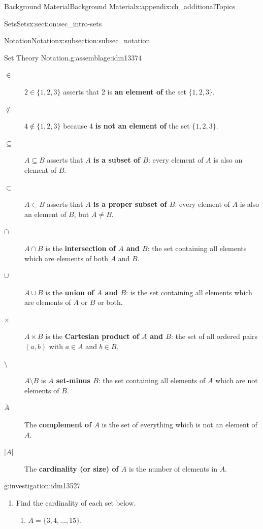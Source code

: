 \documentclass[oneside,10pt,]{book}
\newcommand{\terminology}[1]{\textbf{#1}}
\numberwithin{equation}{chapter}
\newcommand{\card}[1]{\left| #1 \right|}
\begin{document}
\begin{appendixptx}{Background Material}{}{Background Material}{}{}{x:appendix:ch_additionalTopics}
\begin{sectionptx}{Sets}{}{Sets}{}{}{x:section:sec_intro-sets}
\begin{subsectionptx}{Notation}{}{Notation}{}{}{x:subsection:subsec_notation}
\begin{assemblage}{Set Theory Notation.}{g:assemblage:idm13374}
\begin{description}
\item[{\(\in\)}]\(2 \in \{1,2,3\}\) asserts that 2 is \terminology{an element of} the set \(\{1,2,3\}\). \label{g:notation:idm13406}%
\item[{\(\not\in\)}]\(4 \notin \{1,2,3\}\) because 4 \terminology{is not an element of} the set \(\{1,2,3\}\).%
\item[{\(\subseteq\)}]\(A \subseteq B\) asserts that \terminology{\(A\) is a subset of \(B\)}: every element of \(A\) is also an element of \(B\).      \label{g:notation:idm13427}%
\item[{\(\subset\)}]\(A \subset B\) asserts that  \terminology{\(A\) is a proper subset of \(B\)}: every element of \(A\) is also an element of \(B\), but \(A \ne B\).\label{g:notation:idm13442}%
\item[{\(\cap\)}]\(A \cap B\) is the \terminology{intersection of \(A\) and \(B\)}: the set containing all elements which are elements of both \(A\) and \(B\). \label{g:notation:idm13456}%
\item[{\(\cup\)}]\(A \cup B\) is the \terminology{union of \(A\) and \(B\)}: is the set containing all elements which are elements of \(A\) or \(B\) or both.\label{g:notation:idm13471}%
\item[{\(\times\)}]\(A \times B\) is the \terminology{Cartesian product of \(A\) and   \(B\)}: the set of all ordered pairs \((a,b)\) with \(a \in A\) and \(b \in B\).\label{g:notation:idm13487}%
\item[{\(\setminus\)}]\(A \setminus B\) is \terminology{\(A\) set-minus \(B\)}: the set containing all elements of \(A\) which are not elements of \(B\).\label{g:notation:idm13500}%
\item[{\(\overline{A}\)}]The \terminology{complement of \(A\)} is the set of everything which is not an element of \(A\). \label{g:notation:idm13510}%
\item[{\(\card{A}\)}]The \terminology{cardinality (or size) of \(A\)} is the number of elements in \(A\).\label{g:notation:idm13521} %
\end{description}
%
\end{assemblage}
\begin{investigation}{}{g:investigation:idm13527}%
%
\begin{enumerate}
\item{}Find the cardinality of each set below.%
\begin{enumerate}
\item{}\(A = \{3,4,\ldots, 15\}\).%

\end{enumerate}
\end{enumerate}
\end{investigation}
\end{subsectionptx}
\end{sectionptx}
\end{appendixptx}
\end{document}
